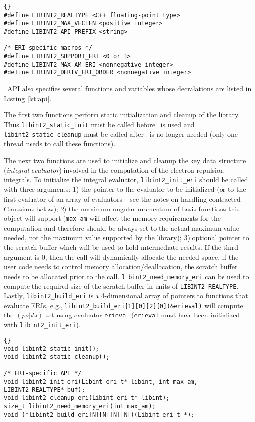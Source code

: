 \documentclass[10pt]{article}
\begin{document}
\begin{lstlisting}[label=lst:valmacros,caption=C preprocessor value macros
provided by \libinth . The angled brackets describe valid macro values.]{}
#define LIBINT2_REALTYPE <C++ floating-point type>
#define LIBINT2_MAX_VECLEN <positive integer>
#define LIBINT2_API_PREFIX <string>

/* ERI-specific macros */
#define LIBINT2_SUPPORT_ERI <0 or 1>
#define LIBINT2_MAX_AM_ERI <nonnegative integer>
#define LIBINT2_DERIV_ERI_ORDER <nonnegative integer>
\end{lstlisting}

\LIBINT\ API also specifies several functions and variables whose decralations
are listed in Listing \ref{lst:api}.

The first two functions perform static initialization and cleanup of the library.
Thus {\tt libint2\_static\_init} must be called before \LIBINT\ is used and
{\tt libint2\_static\_cleanup} must be called after \LIBINT\ is no longer needed (only one thread needs to call these functions).

The next two functions are used to initialize and cleanup the key data
structure ({\em integral evaluator}) involved in the computation of the electron repulsion integrals.
To initialize the integral evaluator, {\tt libint2\_init\_eri} should be called with three arguments:
1) the pointer to the evaluator to be initialized (or to the first evaluator of an array of evaluators -- see the notes on handling contracted Gaussians below); 2) the maximum angular momentum
of basis functions this object will support ({\tt max\_am} will affect the memory requirements
for the computation and therefore should be always set to the actual maximum value needed,
not the maximum value supported by the library); 3) optional pointer to the scratch buffer
which will be used to hold intermediate results. If the third argument is 0, then
the call will dynamically allocate the needed space. If the user code needs to control
memory allocation/deallocation, the scratch buffer needs to be allocated prior to the call.
{\tt libint2\_need\_memory\_eri} can be used to compute the required size of
the scratch buffer in units of {\tt LIBINT2\_REALTYPE}. Lastly, {\tt libint2\_build\_eri} is a 4-dimensional
array of pointers to functions that evaluate ERIs, e.g., {\tt libint2\_build\_eri[1][0][2][0](\&erieval)}
will compute the $(ps|ds)$ set using evaluator {\tt erieval} ({\tt erieval} must have been initialized
with {\tt libint2\_init\_eri}).

\begin{lstlisting}[label=lst:api,caption=\LIBINT\ API  functions and data.
{\tt N = LIBINT2\_MAX\_AM\_ERI + 1}.]{}
void libint2_static_init();
void libint2_static_cleanup();

/* ERI-specific API */
void libint2_init_eri(Libint_eri_t* libint, int max_am, LIBINT2_REALTYPE* buf);
void libint2_cleanup_eri(Libint_eri_t* libint);
size_t libint2_need_memory_eri(int max_am);
void (*libint2_build_eri[N][N][N][N])(Libint_eri_t *);
\end{lstlisting}
\end{document}
